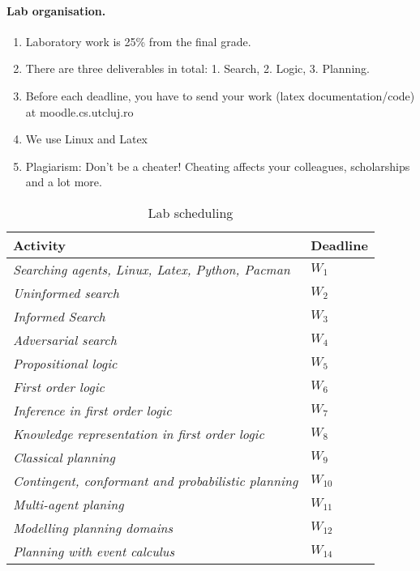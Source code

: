 \newpage
\paragraph{Lab organisation.} 

\begin{enumerate}
 \item Laboratory work is 25\% from the final grade. 
 \item There are three deliverables in total: 1. Search, 2. Logic, 3. Planning.
\item Before each deadline, you have to send your work (latex documentation/code) at moodle.cs.utcluj.ro

\item We use Linux and Latex
\item Plagiarism: Don't be a cheater! Cheating affects your colleagues, scholarships and a lot more.
\end{enumerate}
\begin{table}
\begin{center}
\caption{Lab scheduling}
\begin{tabular}{p{11cm}p{1.7cm}}\hline
\textbf{Activity} & \textbf{Deadline}  \\ \hline
{\it Searching agents, Linux, Latex, Python, Pacman}  & $W_1$ \\ %
{\it Uninformed search} & $W_2$  \\ %
{\it Informed Search} & $W_3$  \\ %
{\it Adversarial search} & $W_4$ \\ %
{\it Propositional logic} & $W_5$ \\ %
{\it First order logic} & $W_6$ \\ %
{\it Inference in first order logic} & $W_7$ \\ %
{\it Knowledge representation in first order logic} & $W_8$ \\ %
{\it Classical planning} & $W_9$ \\ %
{\it Contingent, conformant and probabilistic planning} & $W_{10}$ \\ %
{\it Multi-agent planing} & $W_{11}$ \\ %
{\it Modelling planning domains} & $W_{12}$ \\ %
{\it Planning with event calculus} & $W_{14}$ \\ \hline 
\end{tabular}
\end{center}
\label{tab:first}
\end{table}


